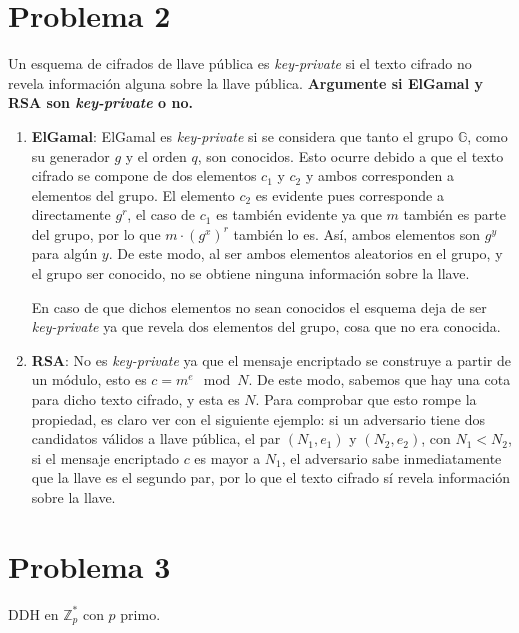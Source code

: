 \documentclass[twoside]{tareas}
\begin{document}
\section*{Problema 2}

Un esquema de cifrados de llave pública es \textit{key-private} si el texto cifrado no revela información alguna sobre la llave pública. \textbf{Argumente si ElGamal y RSA son \textit{key-private} o no.}

\begin{enumerate}
    \item \textbf{ElGamal}:
        ElGamal es \textit{key-private} si se considera que tanto el grupo $\mathbb{G}$, como su generador $g$ y el orden $q$, son conocidos. Esto ocurre debido a que el texto cifrado se compone de dos elementos $c_1$ y $c_2$ y ambos corresponden a elementos del grupo. El elemento $c_2$ es evidente pues corresponde a directamente $g^r$, el caso de $c_1$ es también evidente ya que $m$ también es parte del grupo, por lo que $m \cdot (g^x)^r$ también lo es. Así, ambos elementos son $g^y$ para algún $y$. De este modo, al ser ambos elementos aleatorios en el grupo, y el grupo ser conocido, no se obtiene ninguna información sobre la llave.

        En caso de que dichos elementos no sean conocidos el esquema deja de ser \textit{key-private} ya que revela dos elementos del grupo, cosa que no era conocida.

    \item \textbf{RSA}: No es \textit{key-private} ya que el mensaje encriptado se construye a partir de un módulo, esto es $c = m^e \mod N$. De este modo, sabemos que hay una cota para dicho texto cifrado, y esta es $N$. Para comprobar que esto rompe la propiedad, es claro ver con el siguiente ejemplo: si un adversario tiene dos candidatos válidos a llave pública, el par $(N_1, e_1)$ y $(N_2, e_2)$, con $N_1 < N_2$, si el mensaje encriptado $c$ es mayor a $N_1$, el adversario sabe inmediatamente que la llave es el segundo par, por lo que el texto cifrado sí revela información sobre la llave.
\end{enumerate}

\section*{Problema 3}

DDH en $\mathbb{Z}_p^*$ con $p$ primo.
\end{document}
